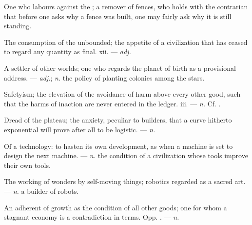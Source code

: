  One who labours against the ; a remover of fences, who holds with the contrarian that before one asks why a fence was built, one may fairly ask why it is still standing.

 The consumption of the unbounded; the appetite of a civilization that has ceased to regard any quantity as final.   xii. ---  \textit{adj.}

 A settler of other worlds; one who regards the planet of birth as a provisional address. ---  \textit{adj.};  \textit{n.} the policy of planting colonies among the stars.

 Safetyism; the elevation of the avoidance of harm above every other good, such that the harms of inaction are never entered in the ledger.   iii. ---  \textit{n.} Cf. .

 Dread of the plateau; the anxiety, peculiar to builders, that a curve hitherto exponential will prove after all to be logistic. ---  \textit{n.}

 Of a technology: to hasten its own development, as when a machine is set to design the next machine.  ---  \textit{n.} the condition of a civilization whose tools improve their own tools.

 The working of wonders by self-moving things; robotics regarded as a sacred art. ---  \textit{n.} a builder of robots.

 An adherent of growth as the condition of all other goods; one for whom a stagnant economy is a contradiction in terms. Opp. . ---  \textit{n.}

